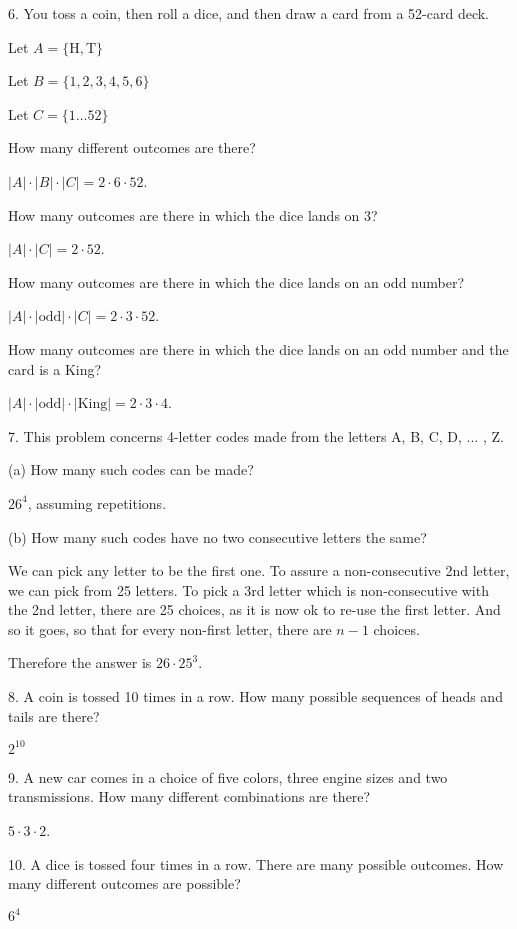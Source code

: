 \documentclass{idrisMemo}
\begin{document}
\begin{prooflist}{ 6. You toss a coin, then roll a dice, and then draw a card from a 52-card deck.}
    \item Let $A = \{\text{H}, \text{T}\}$
    \item Let $B = \{1, 2, 3, 4, 5, 6\}$
    \item Let $C = \{1\ldots 52 \}$
    \item How many different outcomes are there?
    \item $|A| \cdot |B| \cdot |C| = 2 \cdot 6 \cdot 52$.
    \item How many outcomes are there in which the dice lands on $3$?
    \item $|A| \cdot |C| = 2 \cdot 52$.
    \item How many outcomes are there in which the dice lands on an odd number?
    \item $|A| \cdot |\text{odd}| \cdot |C| = 2 \cdot 3 \cdot 52$.
    \item How many outcomes are there in which the dice lands on an odd number
        and the card is a King?
    \item $|A| \cdot |\text{odd}| \cdot |\text{King}| = 2 \cdot 3 \cdot 4$.
\end{prooflist}

\begin{prooflist}{ 7. This problem concerns 4-letter codes made from the letters A, B, C, D, ... , Z. }
\item (a) How many such codes can be made?
\item $26^4$, assuming repetitions.
\item (b) How many such codes have no two consecutive letters the same?
\item We can pick any letter to be the first one. To assure a non-consecutive
    2nd letter, we can pick from 25 letters.  To pick a 3rd letter which is
    non-consecutive with the 2nd letter, there are 25 choices, as it is now ok
    to re-use the first letter. And so it goes, so that for every non-first
    letter, there are $n-1$ choices.
\item Therefore the answer is $26\cdot 25^3$.
\end{prooflist}

\begin{prooflist}{8. A coin is tossed 10 times in a row. How many possible sequences of heads and
tails are there?
}
\item $2^{10}$
\end{prooflist}

\begin{prooflist} {9. A new car comes in a choice of five colors, three engine sizes and two transmissions. How many different combinations are there?}
\item $5 \cdot 3 \cdot 2$.
\end{prooflist}

\begin{prooflist}{ 10. A dice is tossed four times in a row. There are many possible outcomes. How many different outcomes are possible?}
\item $ 6^4$
\end{prooflist}
\end{document}
